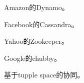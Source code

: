 \begin{theorem}
    
    Amazon的Dynamo。
    
\end{theorem}

\begin{theorem}
    
    Facebook的Cassandra。
    
\end{theorem}

\begin{theorem}
    
    Yahoo的Zookeeper。
    
\end{theorem}

\begin{theorem}
    
    Google的chubby。
    
\end{theorem}

\begin{theorem}
    
    基于tupple space的协同。
    
\end{theorem}
